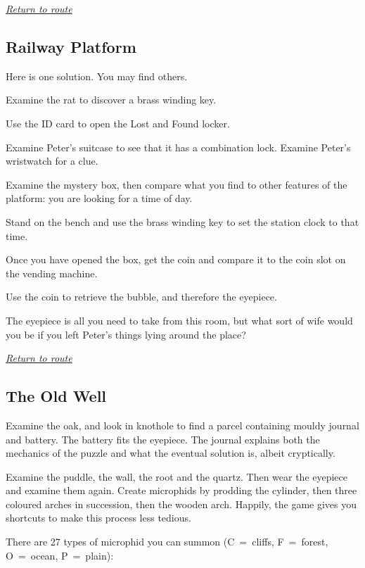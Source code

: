 \documentclass[a5paper]{extarticle}
\begin{document}
\hyperref[sec:route-1]{\emph{Return to route}}

\newpage
\subsection{Railway Platform}\label{sec:sol-Railway-Platform}

Here is one solution. You may find others.

Examine the rat to discover a brass winding key.

Use the ID card to open the Lost and Found locker.

Examine Peter's suitcase to see that it has a combination lock.
Examine Peter's wristwatch for a clue.

Examine the mystery box, then compare what you find to other features of the platform:
you are looking for a time of day.

Stand on the bench and use the brass winding key to set the station clock to that time.

Once you have opened the box, get the coin and compare it to the coin slot on the vending machine.

Use the coin to retrieve the bubble, and therefore the eyepiece.

The eyepiece is all you need to take from this room,
but what sort of wife would you be if you left Peter's things lying around the place?

\hyperref[sec:route-2]{\emph{Return to route}}

\newpage
\subsection{The Old Well}\label{sec:sol-The-Old-Well}

Examine the oak, and look in knothole to find a parcel containing mouldy journal and battery.
The battery fits the eyepiece.
The journal explains both the mechanics of the puzzle and what the eventual solution is,
albeit cryptically.

Examine the puddle, the wall, the root and the quartz.
Then wear the eyepiece and examine them again.
Create microphids by prodding the cylinder,
then three coloured arches in succession, then the wooden arch.
Happily, the game gives you shortcuts to make this process less tedious.

There are 27 types of microphid you can summon (C~=~cliffs, F~=~forest, O~=~ocean, P~=~plain):
\end{document}

